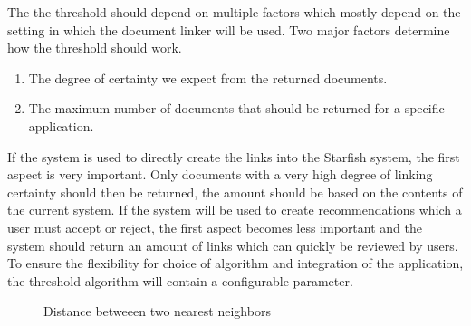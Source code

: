 The the threshold should depend on multiple factors which mostly depend on the setting in which the document linker will be used. Two major factors determine how the threshold should work.
\begin{enumerate}[1.]
	\item The degree of certainty we expect from the returned documents.
	\item The maximum number of documents that should be returned for a specific application.
\end{enumerate}
If the system is used to directly create the links into the Starfish system, the first aspect is very important. Only documents with a very high degree of linking certainty should then be returned, the amount should be based on the contents of the current system. If the system will be used to create recommendations which a user must accept or reject, the first aspect becomes less important and the system should return an amount of links which can quickly be reviewed by users. To ensure the flexibility for choice of algorithm and integration of the application, the threshold algorithm will contain a configurable parameter.

\begin{figure}[h]
\caption{Distance betweeen two nearest neighbors}
\label{fig:thresholds_differences}
\end{figure}

